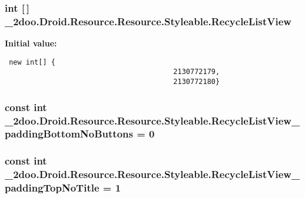 \hypertarget{class__2doo_1_1_droid_1_1_resource_1_1_styleable_4f73f4d4281760ee034b9357bbf6c6d2}{
\subsubsection[{RecycleListView}]{\setlength{\rightskip}{0pt plus 5cm}int \mbox{[}$\,$\mbox{]} \_\-2doo.Droid.Resource.Resource.Styleable.RecycleListView}}
\label{class__2doo_1_1_droid_1_1_resource_1_1_styleable_4f73f4d4281760ee034b9357bbf6c6d2}


\textbf{Initial value:}

\begin{Code}\begin{verbatim} new int[] {
                                        2130772179,
                                        2130772180}
\end{verbatim}
\end{Code}
\hypertarget{class__2doo_1_1_droid_1_1_resource_1_1_styleable_239e4571ae4b1e9a7e20409abc001e86}{
\subsubsection[{RecycleListView\_\-paddingBottomNoButtons}]{\setlength{\rightskip}{0pt plus 5cm}const int \_\-2doo.Droid.Resource.Resource.Styleable.RecycleListView\_\-paddingBottomNoButtons = 0}}
\label{class__2doo_1_1_droid_1_1_resource_1_1_styleable_239e4571ae4b1e9a7e20409abc001e86}


\hypertarget{class__2doo_1_1_droid_1_1_resource_1_1_styleable_c93a689c4367eb8de32d24465993d052}{
\subsubsection[{RecycleListView\_\-paddingTopNoTitle}]{\setlength{\rightskip}{0pt plus 5cm}const int \_\-2doo.Droid.Resource.Resource.Styleable.RecycleListView\_\-paddingTopNoTitle = 1}}
\label{class__2doo_1_1_droid_1_1_resource_1_1_styleable_c93a689c4367eb8de32d24465993d052}


